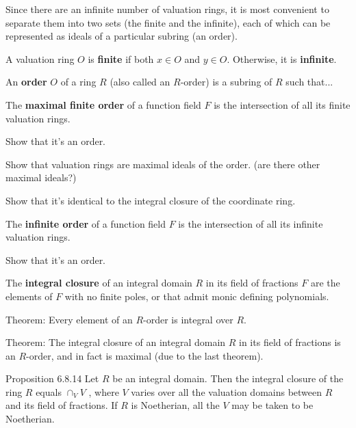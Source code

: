 Since there are an infinite number of valuation rings, it is most convenient to separate them
into two sets (the finite and the infinite), each of which can be represented as ideals
of a particular subring (an order).

\begin{definition}
A valuation ring $O$ is {\bf finite} if both $x \in O$ and $y \in O$.  Otherwise, it is {\bf infinite}.
\end{definition}

\begin{definition}
An {\bf order} $O$ of a ring $R$ (also called an $R$-order) is a subring of $R$ such that...
\end{definition}

\begin{definition}
The {\bf maximal finite order} of a function field $F$ is the intersection of all its finite valuation rings.
\end{definition}

Show that it's an order.

Show that valuation rings are maximal ideals of the order.  (are there other maximal ideals?)

Show that it's identical to the integral closure of the coordinate ring.

\begin{definition}
The {\bf infinite order} of a function field $F$ is the intersection of all its infinite valuation rings.
\end{definition}

Show that it's an order.

\begin{definition}
The {\bf integral closure} of an integral domain $R$ in its field of fractions $F$
are the elements of $F$ with no finite poles, or that admit monic defining polynomials.
\end{definition}

Theorem: Every element of an $R$-order is integral over $R$.

Theorem: The integral closure of an integral domain $R$ in its field of fractions is an $R$-order,
and in fact is maximal (due to the last theorem).

\cite{Swanson Huneke} Proposition 6.8.14 Let $R$ be an integral domain. Then
the integral closure of the ring $R$ equals $\cap_V V$ , where $V$
varies over all the valuation domains between $R$ and its field of
fractions. If $R$ is Noetherian, all the $V$ may be taken to be
Noetherian.


